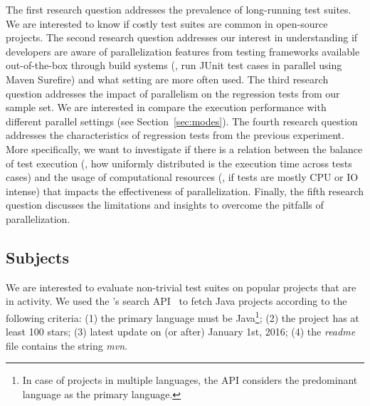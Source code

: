 The first research question addresses the prevalence of long-running
test suites. We are interested to know if costly test suites are
common in open-source projects.  The second research question
addresses our interest in understanding if developers are aware of
parallelization features from testing frameworks available
out-of-the-box through build systems (\eg, run JUnit test cases in
parallel using Maven Surefire) and what setting are more often used.
The third research question addresses the impact of parallelism on the
regression tests from our sample set. We are interested in compare the
execution performance with different parallel settings (see
Section~\ref{sec:modes}). The fourth research question addresses the
characteristics of regression tests from the previous experiment.
More specifically, we want to investigate if there is a relation
between the balance of test execution (\ie, how uniformly distributed
is the execution time across tests cases) and the usage of
computational resources (\ie, if tests are mostly CPU or IO intense)
that impacts the effectiveness of parallelization. Finally, the fifth
research question discusses the limitations and insights to overcome
the pitfalls of parallelization.


\subsection{Subjects}
\label{sec:subjects}

We are interested to evaluate non-trivial test suites on popular
projects that are in activity. We used the \github{}'s search
API~\cite{githubsearch} to fetch Java projects according to the
following criteria: (1) the primary language must be Java\footnote{In
case of projects in multiple languages, the \github{} API considers the
predominant language as the primary language.}; (2) the project has at
least 100 stars; (3) latest update on (or after) January 1st, 2016;
(4) the \emph{readme} file contains the string \emph{mvn}.

